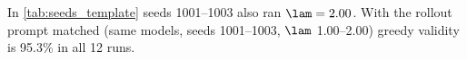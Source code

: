 In \cref{tab:seeds_template} seeds 1001--1003 also ran $\lam=2.00$. With the rollout prompt matched (same models, seeds 1001--1003, $\lam$ 1.00--2.00) greedy validity is 95.3\% in all 12 runs.
